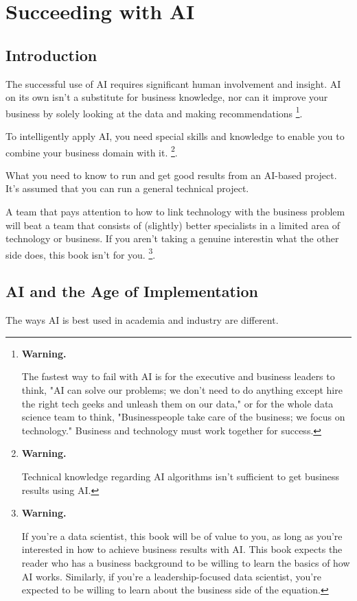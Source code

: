 \section{Succeeding with AI}



\subsection{Introduction}
The successful use of AI requires significant human involvement
and insight. AI on its own isn't a substitute for business knowledge,
nor can it improve your business by solely looking at the data and
making recommendations
\footnote{
    \textbf{Warning.}

    The fastest way to fail with AI is for the executive and business
    leaders to think, "AI can solve our problems; we don't need to do
    anything except hire the right tech geeks and unleash them on our
    data," or for the whole data science team to think,
    "Businesspeople take care of the business; we focus on technology."
    Business and technology must work together for success.
}.

To intelligently apply AI, you need special skills and knowledge to
enable you to combine your business domain with it.
\footnote{
    \textbf{Warning.}

    Technical knowledge regarding AI algorithms isn't sufficient to
    get business results using AI.
}.

What you need to know to run and get good results from an AI-based
project. It's assumed that you can run a general technical project.

A team that pays attention to how to link technology with the business
problem will beat a team that consists of (slightly) better specialists
in a limited area of technology or business. If you aren't taking a
genuine interestin what the other side does, this book isn't for you.
\footnote{
    \textbf{Warning.}

    If you're a data scientist, this book will be of value to you, as
    long as you're interested in how to achieve business results with
    AI. This book expects the reader who has a business background to
    be willing to learn the basics of how AI works. Similarly, if
    you're a leadership-focused data scientist, you're expected to be
    willing to learn about the business side of the equation.
}.


\subsection{AI and the Age of Implementation}
The ways AI is best used in academia and industry are different.

